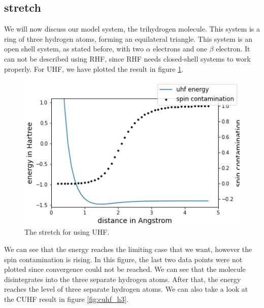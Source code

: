 \documentclass[twoside,twocolumn,9pt]{article}
\begin{document}
\subsection{ stretch}
\label{subsec:h3}
We will now discuss our model system, the trihydrogen molecule. This system is a ring of three hydrogen atoms, forming an equilateral triangle.
This system is an open shell system, as stated before, with two $\alpha$ electrons and one $\beta$ electron. It can not be described using RHF, since RHF needs closed-shell systems to work
properly. For UHF, we have plotted the result in figure \ref{fig:uhf_h3}.
\begin{center}
  \begin{figure}[h]
    \includegraphics[width=\linewidth]{./../notes/figures/h3_uhf_sto-3g.png}
    \caption{The stretch for  using UHF.}
    \label{fig:uhf_h3}
  \end{figure}
\end{center}
We can see that the energy reaches the limiting case that we want, however the spin contamination is rising. In this figure, the last two data points were not plotted since convergence
could not be reached.  We can see that the molecule disintegrates into the three separate hydrogen atoms.
After that, the energy reaches the level of three separate hydrogen atoms. We can also take a look at the CUHF result in
figure \ref{fig:cuhf_h3}.
\end{document}
